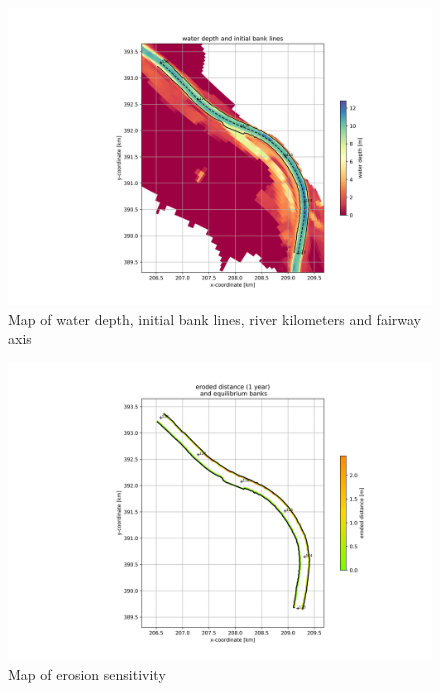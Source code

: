 \begin{figure}
\includegraphics[width=\textwidth]{figures/1_banklines.png}
\caption{Map of water depth, initial bank lines, river kilometers and fairway axis}
\label{Fig2.4}
\end{figure}

\begin{figure}
\includegraphics[width=\textwidth]{figures/2_erosion_sensitivity.png}
\caption{Map of erosion sensitivity}
\label{Fig2.5}
\end{figure}

